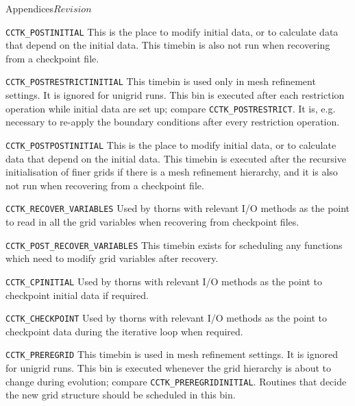 \begin{cactuspart}{Appendices}{}{$Revision$}
\begin{Lentry}
\item[{\tt CCTK\_POSTINITIAL}]
        This is the place to modify initial data, or to calculate data
        that depend on the initial data.  This timebin is also not run
        when recovering from a checkpoint file.
        
\item[{\tt CCTK\_POSTRESTRICTINITIAL}]
        This timebin is used only in mesh refinement settings.  It is
        ignored for unigrid runs.  This bin is executed after each
        restriction operation while initial data are set up; compare
        {\tt CCTK\_POSTRESTRICT}.  It is,
        e.g. necessary to re-apply the
        boundary conditions after every restriction operation.

\item[{\tt CCTK\_POSTPOSTINITIAL}]
        This is the place to modify initial data, or to calculate data
        that depend on the initial data.  This timebin is executed
        after the recursive initialisation of finer grids if there is
        a mesh refinement hierarchy, and it is also not run
        when recovering from a checkpoint file.

\item[{\tt CCTK\_RECOVER\_VARIABLES}]
        Used by thorns with relevant I/O methods as the point 
        to read in all the grid variables when recovering from 
        checkpoint files.
        
\item[{\tt CCTK\_POST\_RECOVER\_VARIABLES}]
        This timebin exists for scheduling any functions which need 
        to modify grid variables after recovery.

\item[{\tt CCTK\_CPINITIAL}]
        Used by thorns with relevant I/O methods as the point to checkpoint
        initial data if required.

\item[{\tt CCTK\_CHECKPOINT}]
        Used by thorns with relevant I/O methods as the point to checkpoint
        data during the iterative loop when required.

\item[{\tt CCTK\_PREREGRID}]
        This timebin is used in mesh refinement settings.  It is
        ignored for unigrid runs.  This bin is executed whenever the
        grid hierarchy is about to change during evolution; compare
        {\tt CCTK\_PREREGRIDINITIAL}.  Routines that decide the
        new grid structure should be scheduled in this bin.


\end{Lentry}
\end{cactuspart}
